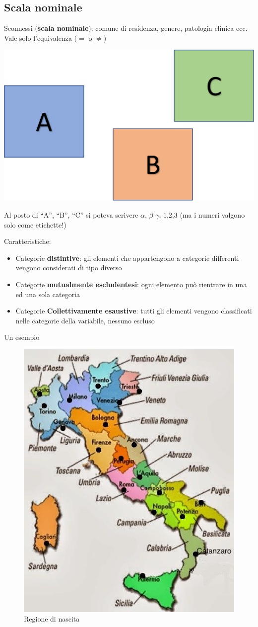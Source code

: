 \documentclass[compress]{beamer}
\begin{document}
\subsection{Scala nominale}
\begin{frame}
Sconnessi (\textbf{scala nominale}): comune di residenza, genere, patologia clinica ecc. Vale solo l'equivalenza ($=$ o $\neq$)

\begin{center}
	\includegraphics[width=.20\linewidth]{nominale.png}
\end{center}

Al posto di ``A'', ``B'', ``C'' si poteva scrivere $\alpha$, $\beta$ $\gamma$, 1,2,3 (ma i numeri valgono solo come etichette!)

Caratteristiche: 

\begin{itemize}
	\item  Categorie \textbf{distintive}: gli elementi che appartengono a categorie differenti vengono considerati di tipo diverso
	\item Categorie \textbf{mutualmente escludentesi}: ogni elemento può rientrare in una ed una sola categoria
	\item Categorie \textbf{Collettivamente esaustive}: tutti gli elementi vengono classificati nelle categorie della variabile, nessuno escluso
	
\end{itemize}
\end{frame}

\begin{frame}{Un esempio}
	\begin{figure}
		\centering
		\includegraphics[width=0.4\linewidth]{regioni}
		\caption{Regione di nascita}
	\end{figure}
\end{frame}
\end{document}
